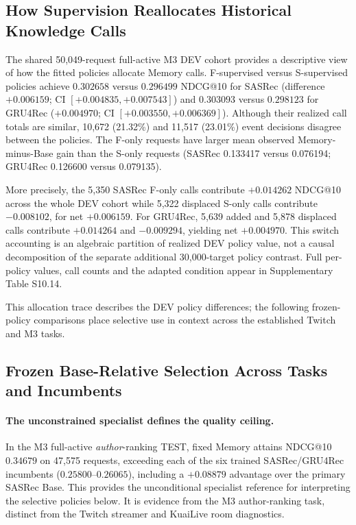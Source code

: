 \FloatBarrier

\subsection{How Supervision Reallocates Historical Knowledge Calls}
\label{sec:results-allocation}

The shared 50,049-request full-active M3 DEV cohort provides a descriptive view of how the fitted policies allocate Memory calls. F-supervised versus S-supervised policies achieve $0.302658$ versus $0.296499$ NDCG@10 for SASRec (difference $+0.006159$; CI $[+0.004835,+0.007543]$) and $0.303093$ versus $0.298123$ for GRU4Rec ($+0.004970$; CI $[+0.003550,+0.006369]$). Although their realized call totals are similar, 10,672 (21.32\%) and 11,517 (23.01\%) event decisions disagree between the policies. The F-only requests have larger mean observed Memory-minus-Base gain than the S-only requests (SASRec 0.133417 versus 0.076194; GRU4Rec 0.126600 versus 0.079135). 

More precisely, the 5,350 SASRec F-only calls contribute $+0.014262$ NDCG@10 across the whole DEV cohort while 5,322 displaced S-only calls contribute $-0.008102$, for net $+0.006159$. For GRU4Rec, 5,639 added and 5,878 displaced calls contribute $+0.014264$ and $-0.009294$, yielding net $+0.004970$. This switch accounting is an algebraic partition of realized DEV policy value, not a causal decomposition of the separate additional 30,000-target policy contrast. Full per-policy values, call counts and the adapted condition appear in Supplementary Table S10.14.

This allocation trace describes the DEV policy differences; the following frozen-policy comparisons place selective use in context across the established Twitch and M3 tasks.

\subsection{Frozen Base-Relative Selection Across Tasks and Incumbents}
\label{sec:results-selection-context}

\paragraph{The unconstrained specialist defines the quality ceiling.} In the M3 full-active \emph{author}-ranking TEST, fixed Memory attains NDCG@10 $0.34679$ on 47,575 requests, exceeding each of the six trained SASRec/GRU4Rec incumbents ($0.25800$--$0.26065$), including a $+0.08879$ advantage over the primary SASRec Base. This provides the unconditional specialist reference for interpreting the selective policies below. It is evidence from the M3 author-ranking task, distinct from the Twitch streamer and KuaiLive room diagnostics.


